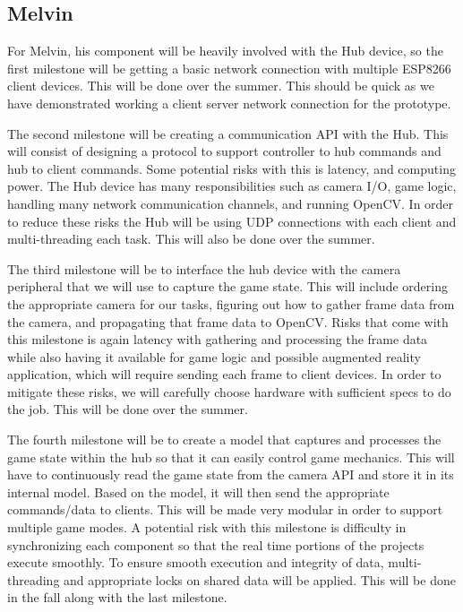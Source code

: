 \documentclass[11pt]{ieeeconf}
\begin{document}
\subsection{Melvin}
For Melvin, his component will be heavily involved with the Hub device, so the first milestone will be getting a basic network connection with multiple ESP8266 client devices. This will be done over the summer. This should be quick as we have demonstrated working a client server network connection for the prototype. 

The second milestone will be creating a communication API with the Hub. This will consist of designing a protocol to support controller to hub commands and hub to client commands. Some potential risks with this is latency, and computing power. The Hub device has many responsibilities such as camera I/O, game logic, handling many network communication channels, and running OpenCV. In order to reduce these risks the Hub will be using UDP connections with each client and multi-threading each task. This will also be done over the summer.

The third milestone will be to interface the hub device with the camera peripheral that we will use to capture the game state. This will include ordering the appropriate camera for our tasks, figuring out how to gather frame data from the camera, and propagating that frame data to OpenCV. Risks that come with this milestone is again latency with gathering and processing the frame data while also having it available for game logic and possible augmented reality application, which will require sending each frame to client devices. In order to mitigate these risks, we will carefully choose hardware with sufficient specs to do the job. This will be done over the summer.

The fourth milestone will be to create a model that captures and processes the game state within the hub so that it can easily control game mechanics. This will have to continuously read the game state from the camera API and store it in its internal model. Based on the model, it will then send the appropriate commands/data to clients. This will be made very modular in order to support multiple game modes. A potential risk with this milestone is difficulty in synchronizing each component so that the real time portions of the projects execute smoothly. To ensure smooth execution and integrity of data, multi-threading and appropriate locks on shared data will be applied. This will be done in the fall along with the last milestone.
\end{document}
